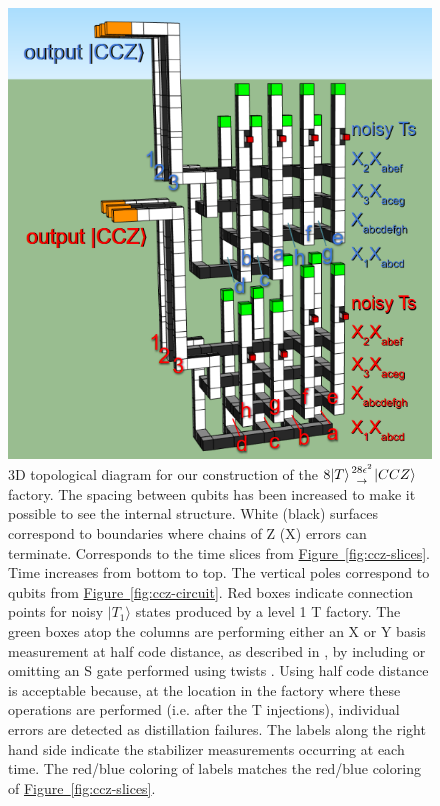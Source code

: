 \documentclass[superscriptaddress,notitlepage,longbibliography]{revtex4-1}
\newcommand{\fig}[1]{\hyperref[fig:#1]{Figure~\ref*{fig:#1}}}
\newcommand{\factory}[3]{$#1 \genfrac{}{}{0pt}{}{#2}{\rightarrow} {#3}$ factory}
\begin{document}
\begin{figure}[ht]
  \label{fig:ccz-3d}
  \includegraphics[width=\textwidth,height=\dimexpr\textheight-14\baselineskip,keepaspectratio]{ccz-3d.png}
  \caption{
    3D topological diagram for our construction of the \factory{8|T\rangle}{28\epsilon^2}{|CCZ\rangle}.
    The spacing between qubits has been increased to make it possible to see the internal structure.
    White (black) surfaces correspond to boundaries where chains of Z (X) errors can terminate.
    Corresponds to the time slices from \fig{ccz-slices}.
    Time increases from bottom to top.
    The vertical poles correspond to qubits from \fig{ccz-circuit}.
    Red boxes indicate connection points for noisy $|T_1\rangle$ states produced by a level 1 T factory.
    The green boxes atop the columns are performing either an X or Y basis measurement at half code distance, as described in \cite{fowler2018}, by including or omitting an S gate performed using twists \cite{brown2017poking}.
    Using half code distance is acceptable because, at the location in the factory where these operations are performed (i.e. after the T injections), individual errors are detected as distillation failures.
    The labels along the right hand side indicate the stabilizer measurements occurring at each time.
    The red/blue coloring of labels matches the red/blue coloring of \fig{ccz-slices}.
}
\end{figure}
\end{document}
